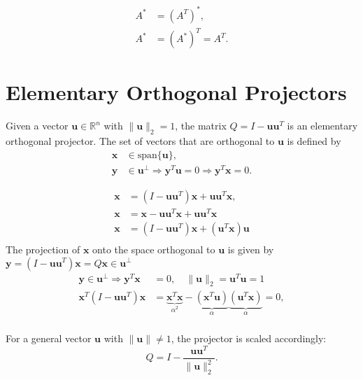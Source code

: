 \begin{align*}
A^* &= (A^T)^*, \\
A^* &= (A^*)^T = A^T.
\end{align*}

\section{Elementary Orthogonal Projectors}

Given a vector \( \mathbf{u} \in \mathbb{R}^n \) with \( \| \mathbf{u} \|_2 = 1 \), the matrix \( Q = I - \mathbf{u}\mathbf{u}^T \) is an elementary orthogonal projector. The set of vectors that are orthogonal to \( \mathbf{u} \) is defined by
\begin{align*}
\mathbf{x} &\in \text{span}\{ \mathbf{u} \}, \\
\mathbf{y} &\in \mathbf{u}^\perp \Rightarrow \mathbf{y}^T\mathbf{u} = 0 \Rightarrow \mathbf{y}^T\mathbf{x} = 0.
\end{align*}

\begin{align*}
\mathbf{x} &= (I - \mathbf{u}\mathbf{u}^T)\mathbf{x} + \mathbf{u}\mathbf{u}^T\mathbf{x}, \\
\mathbf{x} &= \mathbf{x}  - \mathbf{u}\mathbf{u}^T\mathbf{x} + \mathbf{u}\mathbf{u}^T\mathbf{x} \\
\mathbf{x} &= (I - \mathbf{u}\mathbf{u}^T)\mathbf{x} + (\mathbf{u}^T\mathbf{x})\mathbf{u} \\
\end{align*}
The projection of \( \mathbf{x} \) onto the space orthogonal to \( \mathbf{u} \) is given by \( \mathbf{y} = (I - \mathbf{u}\mathbf{u}^T)\mathbf{x} = Q\mathbf{x} \in \mathbf{u}^\perp \)
\begin{align*}
\mathbf{y} \in \mathbf{u}^\perp \Rightarrow \mathbf{y}^T \mathbf{x} &= 0, \quad \| \mathbf{u} \|_2 = \mathbf{u}^T\mathbf{u} = 1 \\
\mathbf{x}^T(I - \mathbf{u}\mathbf{u}^T)\mathbf{x} &= \underbrace{\mathbf{x}^T\mathbf{x}}_{\alpha^2} - \underbrace{(\mathbf{x}^T\mathbf{u})}_{\alpha}\underbrace{(\mathbf{u}^T\mathbf{x})}_{\alpha} = 0, \\
\end{align*}

For a general vector \( \mathbf{u} \) with \( \| \mathbf{u} \| \neq 1 \), the projector is scaled accordingly:
\begin{equation*}
Q = I - \frac{\mathbf{u}\mathbf{u}^T}{\| \mathbf{u} \|_2^2}.
\end{equation*}

